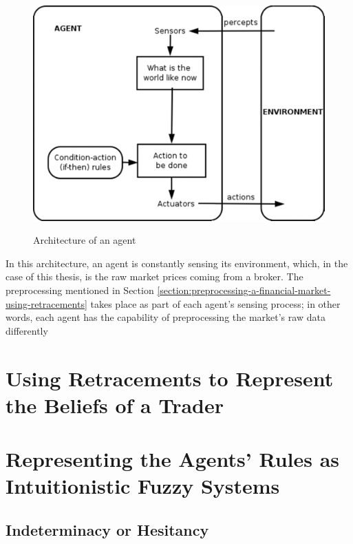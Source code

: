 \begin{figure}
\caption{Architecture of an agent} \centering
\includegraphics[width=1.0\textwidth]{img/agent-architecture.png}
\label{figure:agent-architecture}
\end{figure}

In this architecture, an agent is constantly sensing its environment, which, in
the case of this thesis, is the raw market prices coming from a broker. The
preprocessing mentioned in Section
\ref{section:preprocessing-a-financial-market-using-retracements} takes place as
part of each agent's sensing process; in other words, each agent has the
capability of preprocessing the market's raw data differently

\section{Using Retracements to Represent the Beliefs of a Trader}
\label{section:using-retracements-to-represent-the-beliefs-of-a-trader}

\section{Representing the Agents' Rules as Intuitionistic Fuzzy Systems}
\label{section:representing-the-agents-rules-as-intuitionistic-fuzzy-systems}

\subsection{Indeterminacy or Hesitancy}
\label{subsection:indeterminacy-or-hesitancy}

